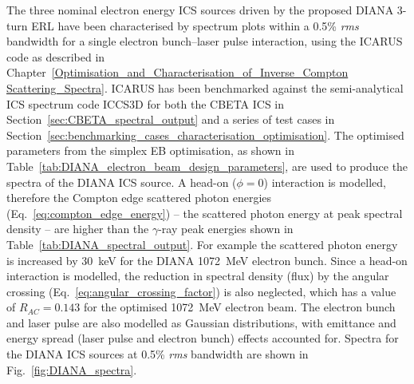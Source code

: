 \documentclass[../main.tex]{subfiles}
\begin{document}
The three nominal electron energy ICS sources driven by the proposed DIANA 3-turn ERL have been characterised by spectrum plots within a 0.5\% \textit{rms} bandwidth for a single electron bunch--laser pulse interaction, using the \textsc{ICARUS} code as described in Chapter~\ref{Optimisation_and_Characterisation_of_Inverse_Compton Scattering_Spectra}. \textsc{ICARUS} has been benchmarked against the semi-analytical ICS spectrum code \textsc{ICCS3D} \cite{krafft2016laser,ranjan2018simulation} for both the CBETA ICS in Section~\ref{sec:CBETA_spectral_output} and a series of test cases in Section~\ref{sec:benchmarking_cases_characterisation_optimisation}. The optimised parameters from the simplex EB optimisation, as shown in Table~\ref{tab:DIANA_electron_beam_design_parameters}, are used to produce the spectra of the DIANA ICS source. A head-on ($\phi=0$) interaction is modelled, therefore the Compton edge scattered photon energies (Eq.~\ref{eq:compton_edge_energy}) -- the scattered photon energy at peak spectral density -- are higher than the $\gamma$-ray peak energies shown in Table~\ref{tab:DIANA_spectral_output}. For example the scattered photon energy is increased by 30~\si{\kilo\electronvolt} for the DIANA 1072~\si{\mega\electronvolt} electron bunch. Since a head-on interaction is modelled, the reduction in spectral density (flux) by the angular crossing (Eq.~\ref{eq:angular_crossing_factor}) is also neglected, which has a value of $R_{AC}=0.143$ for the optimised 1072~\si{\mega\electronvolt} electron beam. The electron bunch and laser pulse are also modelled as Gaussian distributions, with emittance and energy spread (laser pulse and electron bunch) effects accounted for. Spectra for the DIANA ICS sources at 0.5\% \textit{rms} bandwidth are shown in Fig.~\ref{fig:DIANA_spectra}.
\end{document}
